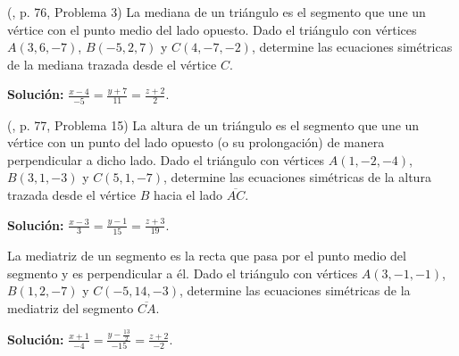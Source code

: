 \begin{prob} (\cite{espinoza2006Algebralineal}, p. 76, Problema 3) La mediana de un triángulo es el segmento que une un vértice con el punto medio del lado opuesto. Dado el triángulo con vértices $A(3,6,-7)$, $B(-5,2,7)$ y $C(4,-7,-2)$, determine las ecuaciones simétricas de la mediana trazada desde el vértice $C$. 

\textbf{Solución:} $\frac{x-4}{-5}=\frac{y+7}{11}=\frac{z+2}{2}$.
\end{prob}

\begin{prob} (\cite{espinoza2006Algebralineal}, p. 77, Problema 15) La altura de un triángulo es el segmento que une un vértice con un punto del lado opuesto (o su prolongación) de manera perpendicular a dicho lado. Dado el triángulo con vértices $A(1,-2,-4)$, $B(3,1,-3)$ y $C(5,1,-7)$, determine las ecuaciones simétricas de la altura trazada desde el vértice $B$ hacia el lado $\overline{AC}$. 

\textbf{Solución:} $\frac{x-3}{3}=\frac{y-1}{15}=\frac{z+3}{19}$.
\end{prob}

\begin{prob} La mediatriz de un segmento es la recta que pasa por el punto medio del segmento y es perpendicular a él. Dado el triángulo con vértices $A(3,-1,-1)$, $B(1,2,-7)$ y $C(-5,14,-3)$, determine las ecuaciones simétricas de la mediatriz del segmento $\overline{CA}$. 

\textbf{Solución:} $\frac{x+1}{-4}=\frac{y-\frac{13}{2}}{-15}=\frac{z+2}{-2}$.
\end{prob}